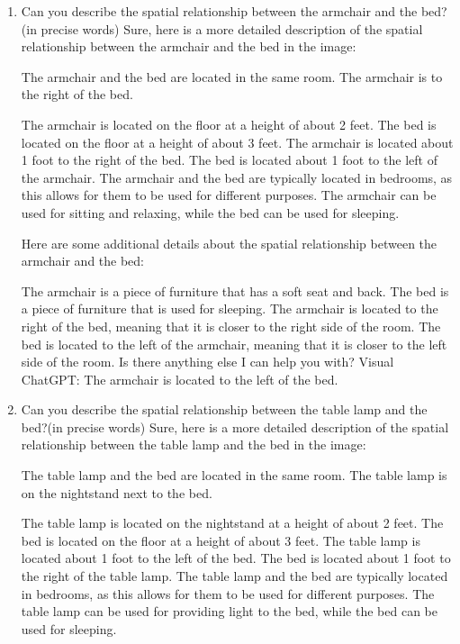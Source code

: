 \begin{enumerate}
    \item Can you describe the spatial relationship between the armchair and the bed?(in precise words)
    \subitem Sure, here is a more detailed description of the spatial relationship between the armchair and the bed in the image:

    The armchair and the bed are located in the same room. The armchair is to the right of the bed.
    
    The armchair is located on the floor at a height of about 2 feet.
    The bed is located on the floor at a height of about 3 feet.
    The armchair is located about 1 foot to the right of the bed.
    The bed is located about 1 foot to the left of the armchair.
    The armchair and the bed are typically located in bedrooms, as this allows for them to be used for different purposes. The armchair can be used for sitting and relaxing, while the bed can be used for sleeping.
    
    Here are some additional details about the spatial relationship between the armchair and the bed:
    
    The armchair is a piece of furniture that has a soft seat and back.
    The bed is a piece of furniture that is used for sleeping.
    The armchair is located to the right of the bed, meaning that it is closer to the right side of the room.
    The bed is located to the left of the armchair, meaning that it is closer to the left side of the room.
    Is there anything else I can help you with?
    \subitem Visual ChatGPT: The armchair is located to the left of the bed.
    \item Can you describe the spatial relationship between the table lamp and the bed?(in precise words)
    \subitem 
    Sure, here is a more detailed description of the spatial relationship between the table lamp and the bed in the image:
    
    The table lamp and the bed are located in the same room. The table lamp is on the nightstand next to the bed.
    
    The table lamp is located on the nightstand at a height of about 2 feet.
    The bed is located on the floor at a height of about 3 feet.
    The table lamp is located about 1 foot to the left of the bed.
    The bed is located about 1 foot to the right of the table lamp.
    The table lamp and the bed are typically located in bedrooms, as this allows for them to be used for different purposes. The table lamp can be used for providing light to the bed, while the bed can be used for sleeping.
    

\end{enumerate}
